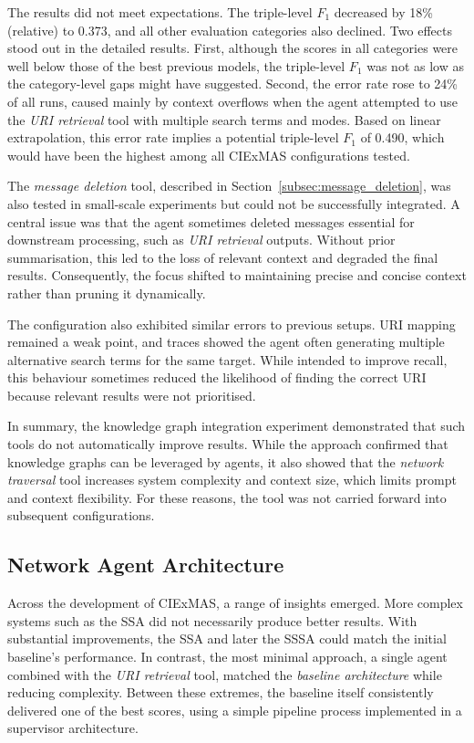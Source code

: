 \documentclass[a4paper,oneside,bibliography=totoc]{scrbook}
\begin{document}
The results did not meet expectations. The triple-level $F_{1}$ decreased by 18\% (relative) to 0.373, and all other evaluation categories also declined. Two effects stood out in the detailed results. First, although the scores in all categories were well below those of the best previous models, the triple-level $F_{1}$ was not as low as the category-level gaps might have suggested. Second, the error rate rose to 24\% of all runs, caused mainly by context overflows when the agent attempted to use the \textit{URI retrieval} tool with multiple search terms and modes. Based on linear extrapolation, this error rate implies a potential triple-level $F_{1}$ of 0.490, which would have been the highest among all CIExMAS configurations tested.

The \textit{message deletion} tool, described in Section~\ref{subsec:message_deletion}, was also tested in small-scale experiments but could not be successfully integrated. A central issue was that the agent sometimes deleted messages essential for downstream processing, such as \textit{URI retrieval} outputs. Without prior summarisation, this led to the loss of relevant context and degraded the final results. Consequently, the focus shifted to maintaining precise and concise context rather than pruning it dynamically.

The configuration also exhibited similar errors to previous setups. URI mapping remained a weak point, and traces showed the agent often generating multiple alternative search terms for the same target. While intended to improve recall, this behaviour sometimes reduced the likelihood of finding the correct URI because relevant results were not prioritised.

In summary, the knowledge graph integration experiment demonstrated that such tools do not automatically improve results. While the approach confirmed that knowledge graphs can be leveraged by agents, it also showed that the \textit{network traversal} tool increases system complexity and context size, which limits prompt and context flexibility. For these reasons, the tool was not carried forward into subsequent configurations.

\subsection{Network Agent Architecture}
\label{subsec:full_network_agent_architecture}

Across the development of CIExMAS, a range of insights emerged. More complex systems such as the \ac{SSA} did not necessarily produce better results. With substantial improvements, the \ac{SSA} and later the \ac{SSSA} could match the initial baseline’s performance. In contrast, the most minimal approach, a single agent combined with the \textit{URI retrieval} tool, matched the \textit{baseline architecture} while reducing complexity. Between these extremes, the baseline itself consistently delivered one of the best scores, using a simple pipeline process implemented in a supervisor architecture.
\end{document}
